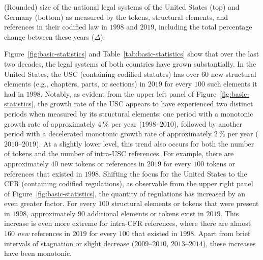 \begin{table}
	\centering
	
	\caption{(Rounded) size of the national legal systems of the United States (top) and Germany (bottom) as measured by the tokens, structural elements, and references in their codified law in $1998$ and $2019$, including the total percentage change between these years ($\Delta$).}\label{tab:basic-statistics}
\end{table}

Figure~\ref{fig:basic-statistics} and Table~\ref{tab:basic-statistics} show that over the last two decades, the legal systems of both countries have grown substantially.  
In the United States, the USC (containing codified statutes) has over $60$ new structural elements (e.g., chapters, parts, or sections) in $2019$ for every $100$ such elements it had in $1998$.
Notably, as evident from the upper left panel of Figure~\ref{fig:basic-statistics}, the growth rate of the USC appears to have experienced two distinct periods when measured by its structural elements: 
one period with a monotonic growth rate of approximately $4~\%$ per year ($1998$--$2010$), followed by another period with a decelerated monotonic growth rate of approximately $2~\%$ per year ($2010$--$2019$). 
At a slightly lower level, this trend also occurs for both the number of tokens and the number of intra-USC references. 
For example, there are approximately $40$ new tokens or references in $2019$ for every $100$ tokens or references that existed in $1998$.
Shifting the focus for the United States to the CFR (containing codified regulations), as observable from the upper right panel of Figure~\ref{fig:basic-statistics}, the quantity of regulations has increased by an even greater factor.  
For every $100$ structural elements or tokens that were present in $1998$, approximately $90$ additional elements or tokens exist in $2019$. 
This increase is even more extreme for intra-CFR references, where there are almost $160$ \emph{new} references in $2019$ for every $100$ that existed in $1998$.  
Apart from brief intervals of stagnation or slight decrease ($2009$--$2010$, $2013$--$2014$), 
these increases have been monotonic.

